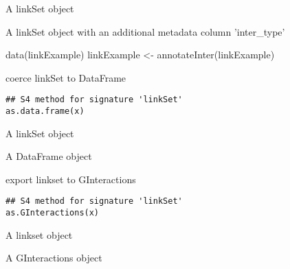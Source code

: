 \documentclass[letterpaper]{book}
\begin{document}
%
\begin{Arguments}
\begin{ldescription}
\item[\code{x}] A linkSet object
\end{ldescription}
\end{Arguments}
%
\begin{Value}
A linkSet object with an additional metadata column 'inter\_type'
\end{Value}
%
\begin{Examples}
\begin{ExampleCode}
data(linkExample)
linkExample <- annotateInter(linkExample)
\end{ExampleCode}
\end{Examples}
%
\begin{Description}
coerce linkSet to DataFrame
\end{Description}
%
\begin{Usage}
\begin{verbatim}
## S4 method for signature 'linkSet'
as.data.frame(x)
\end{verbatim}
\end{Usage}
%
\begin{Arguments}
\begin{ldescription}
\item[\code{x}] A linkSet object
\end{ldescription}
\end{Arguments}
%
\begin{Value}
A DataFrame object
\end{Value}
%
\begin{Description}
export linkset to GInteractions
\end{Description}
%
\begin{Usage}
\begin{verbatim}
## S4 method for signature 'linkSet'
as.GInteractions(x)
\end{verbatim}
\end{Usage}
%
\begin{Arguments}
\begin{ldescription}
\item[\code{x}] A linkset object
\end{ldescription}
\end{Arguments}
%
\begin{Value}
A GInteractions object
\end{Value}
\end{document}
